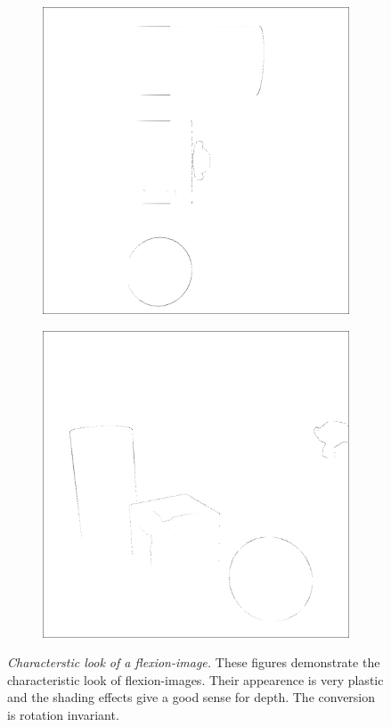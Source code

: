 \begin{figure}[tb]
\begin{subfigure}[t]{0.32\textwidth}
        \includegraphics[width=\linewidth]{chapter04/img/flexion-0030.png}
    \end{subfigure}
    \begin{subfigure}[t]{0.32\textwidth}
        \includegraphics[width=\linewidth]{chapter04/img/flexion-0210.png}
    \end{subfigure}
    \caption[Characterstic look of a \gls{flexion-image}]{\emph{Characterstic look of a \gls{flexion-image}.} These figures demonstrate the characteristic look of \Glspl{flexion-image}. Their appearence is very plastic and the shading effects give a good sense for depth. The conversion is rotation invariant.}\label{fig:flexion_images}
\end{figure}

